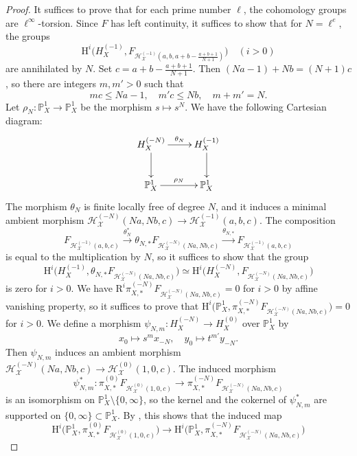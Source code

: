 \documentclass{amsart}
\theoremstyle{plain}
\theoremstyle{definition}
\theoremstyle{remark}
\numberwithin{equation}{section}
\begin{document}
\begin{proof}
	It suffices to prove that for each prime number $\ell$, the cohomology groups are $\ell^\infty$-torsion.
	Since $F$ has left continuity, it suffices to show that for $N=\ell^e$, the groups
	$$
		\mathrm{H}^i\bigl(H^{(-1)}_X, F_{\mathcal{H}^{(-1)}_\mathcal{X}(a,b,a+b-\frac{a+b+1}{N+1})}\bigr)\quad (i>0)
	$$
	are annihilated by $N$.
	Set $c=a+b-\frac{a+b+1}{N+1}$.
	Then $(Na-1)+Nb=(N+1)c$, so there are integers $m,m'>0$ such that
	$$
		m c \leq N a-1,\quad m' c\leq N b,\quad m+m'=N.
	$$
	Let $\rho_{N}\colon \mathbb{P}^1_X\to \mathbb{P}^1_X$ be the morphism $s\mapsto s^N$.
	We have the following Cartesian diagram:
	$$
	\xymatrix{
		H^{(-N)}_X\ar[r]^-{\theta_N}\ar[d]		&H^{(-1)}_X\ar[d]\\
		\mathbb{P}^1_X\ar[r]^-{\rho_N}				&\mathbb{P}^1_X
	}
	$$
	The morphism $\theta_N$ is finite locally free of degree $N$, and it induces a minimal ambient morphism $\mathcal{H}_\mathcal{X}^{(-N)}(Na,Nb,c)\to \mathcal{H}_\mathcal{X}^{(-1)}(a,b,c)$.
	The composition
	$$
		F_{\mathcal{H}^{(-1)}_\mathcal{X}(a,b,c)}\xrightarrow{\theta_N^*} \theta_{N,*} F_{\mathcal{H}^{(-N)}_\mathcal{X}(Na,Nb,c)}\xrightarrow{\theta_{N,*}} F_{\mathcal{H}^{(-1)}_\mathcal{X}(a,b,c)}
	$$
	is equal to the multiplication by $N$, so it suffices to show that the group 
	$$
		\mathrm{H}^i\bigl(H^{(-1)}_X, \theta_{N,*}F_{\mathcal{H}^{(-N)}_\mathcal{X}(Na,Nb,c)}\bigr)\simeq
		\mathrm{H}^i\bigl(H^{(-N)}_X, F_{\mathcal{H}^{(-N)}_\mathcal{X}(Na,Nb,c)}\bigr)
	$$
	is zero for $i>0$.
	We have $\mathrm{R}^i\pi^{(-N)}_{X,*}F_{\mathcal{H}^{(-N)}_\mathcal{X}(Na,Nb,c)}=0$ for $i>0$ by affine vanishing property, so it suffices to prove that $\mathrm{H}^i\bigl(\mathbb{P}^1_X, \pi^{(-N)}_{X,*}F_{\mathcal{H}_\mathcal{X}^{(-N)}(Na,Nb,c)}\bigr)=0$ for $i>0$.
	We define a morphism $\psi_{N,m}\colon H^{(-N)}_X\to H^{(0)}_X$ over $\mathbb{P}^1_X$ by
	$$
		x_0\mapsto s^m x_{-N},\quad y_0\mapsto t^{m'}y_{-N}.
	$$
	Then $\psi_{N,m}$ induces an ambient morphism $\mathcal{H}_\mathcal{X}^{(-N)}(Na,Nb,c)\to \mathcal{H}^{(0)}_\mathcal{X}(1,0,c)$.
	The induced morphism
	$$
		\psi_{N,m}^*\colon \pi^{(0)}_{X,*}F_{\mathcal{H}_\mathcal{X}^{(0)}(1,0,c)} \to \pi^{(-N)}_{X,*}F_{\mathcal{H}_\mathcal{X}^{(-N)}(Na,Nb,c)}
	$$
	is an isomorphism on $\mathbb{P}^1_X\setminus\{0,\infty\}$, so the kernel and the cokernel of $\psi_{N,m}^*$ are supported on $\{0,\infty\}\subset\mathbb{P}^1_X$.
	By , this shows that the induced map
	$$
		\mathrm{H}^i\bigl(\mathbb{P}^1_X, \pi^{(0)}_{X,*}F_{\mathcal{H}_\mathcal{X}^{(0)}(1,0,c)}\bigr)\to
		\mathrm{H}^i\bigl(\mathbb{P}^1_X, \pi^{(-N)}_{X,*}F_{\mathcal{H}_\mathcal{X}^{(-N)}(Na,Nb,c)}\bigr)
$$
\end{proof}
\end{document}
